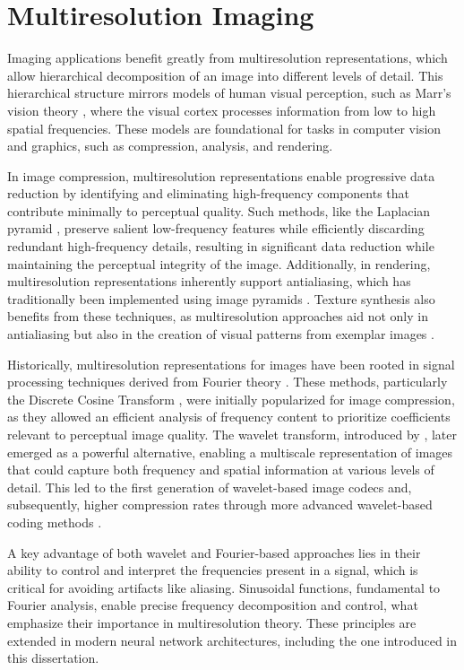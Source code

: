\chapter{Multiresolution Imaging}
\label{ch:imaging}

Imaging applications benefit greatly from multiresolution representations, which allow hierarchical decomposition of an image into different levels of detail. This hierarchical structure mirrors models of human visual perception, such as Marr’s vision theory \citep{marr82}, where the visual cortex processes information from low to high spatial frequencies. These models are foundational for tasks in computer vision and graphics, such as compression, analysis, and rendering.

In image compression, multiresolution representations enable progressive data reduction by identifying and eliminating high-frequency components that contribute minimally to perceptual quality. Such methods, like the Laplacian pyramid \citep{burt1987laplacian}, preserve salient low-frequency features while efficiently discarding redundant high-frequency details, resulting in significant data reduction while maintaining the perceptual integrity of the image. Additionally, in rendering, multiresolution representations inherently support antialiasing, which has traditionally been implemented using image pyramids \citep{mipmap83}. Texture synthesis also benefits from these techniques, as multiresolution approaches aid not only in antialiasing but also in the creation of visual patterns from exemplar images \citep{thies19}.

Historically, multiresolution representations for images have been rooted in signal processing techniques derived from Fourier theory \citep{bracewell1986fourier}. These methods, particularly the Discrete Cosine Transform \citep{dct-og}, were initially popularized for image compression, as they allowed an efficient analysis of frequency content to prioritize coefficients relevant to perceptual image quality. The wavelet transform, introduced by \citet{mallat1989theory}, later emerged as a powerful alternative, enabling a multiscale representation of images that could capture both frequency and spatial information at various levels of detail. This led to the first generation of wavelet-based image codecs \citep{antonini1992image} and, subsequently, higher compression rates through more advanced wavelet-based coding methods \citep{mallat-2gen}.

A key advantage of both wavelet and Fourier-based approaches lies in their ability to control and interpret the frequencies present in a signal, which is critical for avoiding artifacts like aliasing. Sinusoidal functions, fundamental to Fourier analysis, enable precise frequency decomposition and control, what emphasize their importance in multiresolution theory. These principles are extended in modern neural network architectures, including the one introduced in this dissertation.

